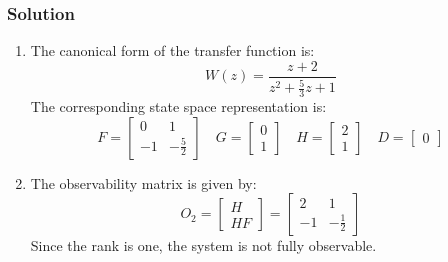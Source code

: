 \subsubsection*{Solution}
\begin{enumerate}
    \item The canonical form of the transfer function is:
        \[W(z)=\dfrac{z+2}{z^2+\frac{5}{3}z+1}\]
        The corresponding state space representation is:
        \[F=\begin{bmatrix} 0 & 1 \\ -1 & -\frac{5}{2} \end{bmatrix} \quad G=\begin{bmatrix} 0 \\ 1 \end{bmatrix} \quad H=\begin{bmatrix} 2 \\ 1 \end{bmatrix} \quad D=\begin{bmatrix} 0 \end{bmatrix}\]
    \item The observability matrix is given by:
        \[O_2=\begin{bmatrix} H \\ HF \end{bmatrix}=\begin{bmatrix} 2 & 1 \\ -1 & -\frac{1}{2} \end{bmatrix}\]
        Since the rank is one, the system is not fully observable.
        

\end{enumerate}
